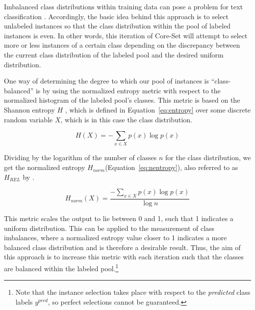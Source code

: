 \documentclass[english,bachelor,ul]{webisthesis} %
\begin{document}
Imbalanced class distributions within training data can pose a problem for text classification \citep{DBLP:conf/eacl/HenningBFF23}. Accordingly, the basic idea behind this approach is to select unlabeled instances so that the class distribution within the pool of labeled instances is even. In other words, this iteration of Core-Set will attempt to select more or less instances of a certain class depending on the discrepancy between the current class distribution of the labeled pool and the desired uniform distribution.

One way of determining the degree to which our pool of instances is ``class-balanced'' is by using the normalized entropy metric with respect to the normalized histogram of the labeled pool's classes. This metric is based on the Shannon entropy $ H $ \citep{DBLP:journals/bstj/Shannon48}, which is defined in Equation~\ref{eq:entropy} over some discrete random variable $ X $, which is in this case the class distribution.

\begin{equation}\label{eq:entropy}
    H(X) = -\sum_{x \in X} p(x) \log p(x)
\end{equation}

\noindent Dividing by the logarithm of the number of classes $n$ for the class distribution, we get the normalized entropy $ H_{norm} $(Equation~\ref{eq:nentropy}), also referred to as $ H_{REL} $ by \cite{wilcox1967indices}.

\begin{equation}\label{eq:nentropy}
    H_{norm}(X) = \frac{-\sum_{x \in X} p(x) \log p(x)}{\log n}
\end{equation}

\noindent This metric scales the output to lie between 0 and 1, such that 1 indicates a uniform distribution. This can be applied to the measurement of class imbalances, where a normalized entropy value closer to 1 indicates a more balanced class distribution and is therefore a desirable result. Thus, the aim of this approach is to increase this metric with each iteration such that the classes are balanced within the labeled pool.\footnote{Note that the instance selection takes place with respect to the \textit{predicted} class labels $ y^{pred} $, so perfect selections cannot be guaranteed.}
\end{document}
